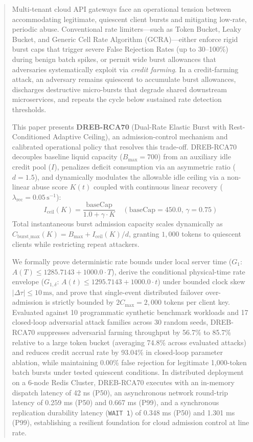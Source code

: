\documentclass[conference]{IEEEtran}
\begin{document}
\begin{abstract}
Multi-tenant cloud API gateways face an operational tension between accommodating legitimate, quiescent client bursts and mitigating low-rate, periodic abuse. Conventional rate limiters---such as Token Bucket, Leaky Bucket, and Generic Cell Rate Algorithm (GCRA)---either enforce rigid burst caps that trigger severe False Rejection Rates (up to 30--100\%) during benign batch spikes, or permit wide burst allowances that adversaries systematically exploit via \textit{credit farming}. In a credit-farming attack, an adversary remains quiescent to accumulate burst allowances, discharges destructive micro-bursts that degrade shared downstream microservices, and repeats the cycle below sustained rate detection thresholds.

This paper presents \textbf{DREB-RCA70} (Dual-Rate Elastic Burst with Rest-Conditioned Adaptive Ceiling), an admission-control mechanism and calibrated operational policy that resolves this trade-off. DREB-RCA70 decouples baseline liquid capacity ($B_{\max} = 700$) from an auxiliary idle credit pool ($I$), penalizes deficit consumption via an asymmetric ratio ($d = 1.5$), and dynamically modulates the allowable idle ceiling via a non-linear abuse score $K(t)$ coupled with continuous linear recovery ($\lambda_{\text{rec}} = 0.05\,\text{s}^{-1}$):
$$I_{\text{ceil}}(K) = \frac{\text{baseCap}}{1.0 + \gamma \cdot K} \quad (\text{baseCap} = 450.0, \, \gamma = 0.75)$$
Total instantaneous burst admission capacity scales dynamically as $C_{\text{burst\_max}}(K) = B_{\max} + I_{\text{ceil}}(K)/d$, granting $1,000$ tokens to quiescent clients while restricting repeat attackers.

We formally prove deterministic rate bounds under local server time ($G_1$: $A(T) \le 1285.7143 + 1000.0 \cdot T$), derive the conditional physical-time rate envelope ($G_{1,\delta}$: $A(t) \le 1295.7143 + 1000.0 \cdot t$) under bounded clock skew $|\Delta \tau| \le 10\,\text{ms}$, and prove that single-event distributed failover over-admission is strictly bounded by $2 C_{\max} = 2,000$ tokens per client key. Evaluated against 10 programmatic synthetic benchmark workloads and 17 closed-loop adversarial attack families across 30 random seeds, DREB-RCA70 suppresses adversarial farming throughput by 56.7\% to 85.7\% relative to a large token bucket (averaging 74.8\% across evaluated attacks) and reduces credit accrual rate by 93.04\% in closed-loop parameter ablation, while maintaining 0.00\% false rejection for legitimate 1,000-token batch bursts under tested quiescent conditions. In distributed deployment on a 6-node Redis Cluster, DREB-RCA70 executes with an in-memory dispatch latency of 42 ns (P50), an asynchronous network round-trip latency of 0.259 ms (P50) and 0.667 ms (P99), and a synchronous replication durability latency (\texttt{WAIT 1}) of 0.348 ms (P50) and 1.301 ms (P99), establishing a resilient foundation for cloud admission control at line rate.
\end{abstract}
\end{document}
